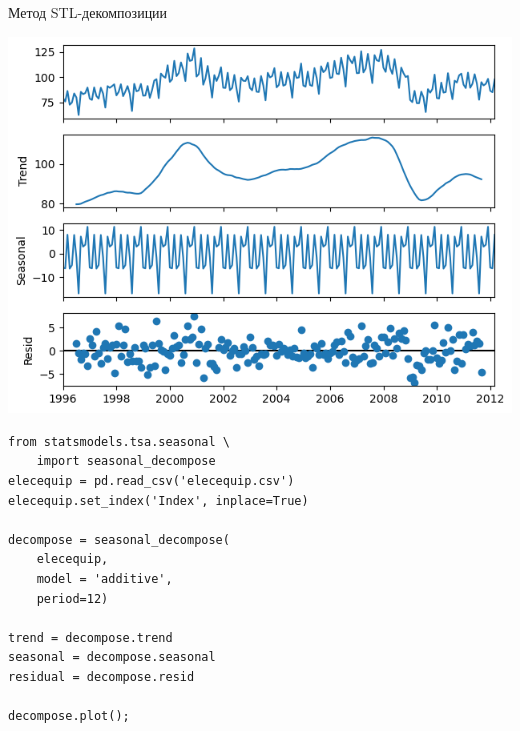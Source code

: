 \documentclass[10pt,pdf,utf8,hyperref={unicode},aspectratio=169]{beamer}
\begin{document}
\begin{frame}[fragile]{Метод STL-декомпозиции}
		\begin{multicols*}{2}
			\begin{center}
				\includegraphics[height=0.6\textheight]{elecequip_stl.png}
			\end{center}			
		\columnbreak
	
		\footnotesize
		\begin{verbatim}
from statsmodels.tsa.seasonal \
	import seasonal_decompose
elecequip = pd.read_csv('elecequip.csv')
elecequip.set_index('Index', inplace=True)

decompose = seasonal_decompose(
	elecequip, 
	model = 'additive', 
	period=12)

trend = decompose.trend
seasonal = decompose.seasonal
residual = decompose.resid

decompose.plot();			
		\end{verbatim}
		\let\thefootnote\relax{}
		\end{multicols*}
\end{frame}
\end{document}
